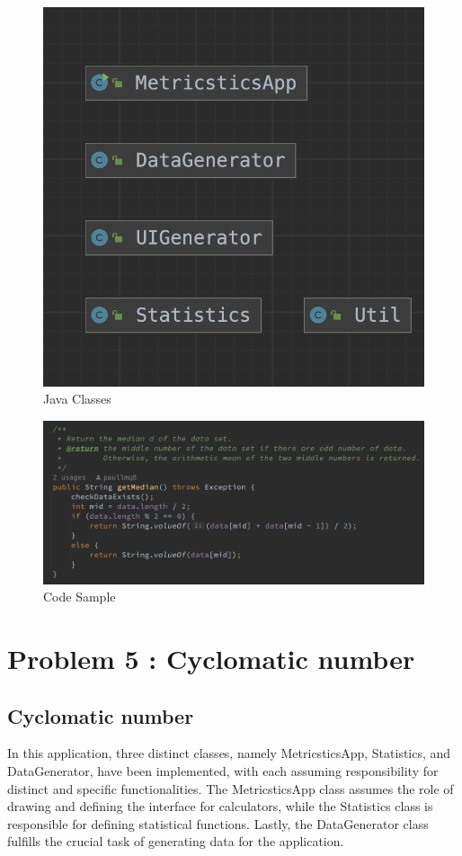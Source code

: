 \documentclass[12pt,letterpaper]{report}
\begin{document}
\begin{figure}
    \begin{center}
    \includegraphics[width=0.5\linewidth]{classes.png}
    \end{center}
       \caption{Java Classes \label{Java Classes}}
\end{figure}

\begin{figure}
    \begin{center}
    \includegraphics[width=0.5\linewidth]{code_sample.png}
    \end{center}
       \caption{Code Sample \label{Code Sample}}
\end{figure}


\chapter{Problem 5 : Cyclomatic number}
\section{Cyclomatic number}
 In this application, three distinct classes, namely MetricsticsApp, Statistics, and DataGenerator, have been implemented, with each assuming responsibility for distinct and specific functionalities. The MetricsticsApp class assumes the role of drawing and defining the interface for calculators, while the Statistics class is responsible for defining statistical functions. Lastly, the DataGenerator class fulfills the crucial task of generating data for the application.\\
\end{document}
